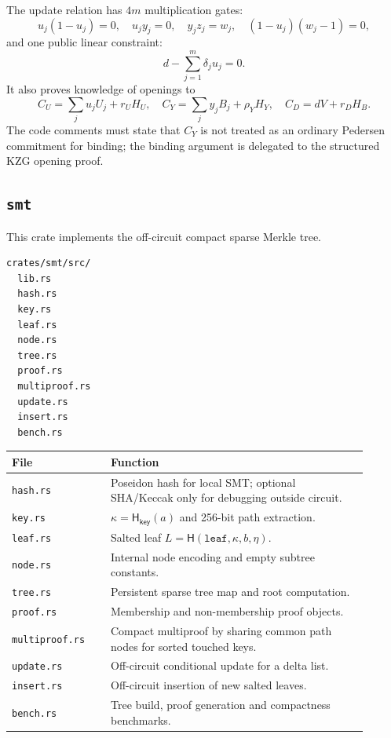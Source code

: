 \documentclass[UTF8,a4paper,11pt]{ctexart}
\newcommand{\Hash}{\mathsf H}
\begin{document}
The update relation has $4m$ multiplication gates:
\[
  u_j(1-u_j)=0,
  \quad u_jy_j=0,
  \quad y_jz_j=w_j,
  \quad (1-u_j)(w_j-1)=0,
\]
and one public linear constraint:
\[
  d-\sum_{j=1}^m\delta_j u_j=0.
\]
It also proves knowledge of openings to
\[
  C_U=\sum_j u_jU_j+r_UH_U,
  \quad C_Y=\sum_j y_jB_j+\rho_YH_Y,
  \quad C_D=dV+r_DH_B.
\]
The code comments must state that $C_Y$ is not treated as an ordinary Pedersen commitment for binding; the binding argument is delegated to the structured KZG opening proof.

\subsection{\texttt{smt}}

This crate implements the off-circuit compact sparse Merkle tree.

\begin{lstlisting}
crates/smt/src/
  lib.rs
  hash.rs
  key.rs
  leaf.rs
  node.rs
  tree.rs
  proof.rs
  multiproof.rs
  update.rs
  insert.rs
  bench.rs
\end{lstlisting}

\begin{longtable}{p{0.25\linewidth}p{0.65\linewidth}}
\toprule
File & Function \\
\midrule
\texttt{hash.rs} & Poseidon hash for local SMT; optional SHA/Keccak only for debugging outside circuit. \\
\texttt{key.rs} & $\kappa=\Hash_{\mathsf{key}}(a)$ and 256-bit path extraction. \\
\texttt{leaf.rs} & Salted leaf $L=\Hash(\mathtt{leaf},\kappa,b,\eta)$. \\
\texttt{node.rs} & Internal node encoding and empty subtree constants. \\
\texttt{tree.rs} & Persistent sparse tree map and root computation. \\
\texttt{proof.rs} & Membership and non-membership proof objects. \\
\texttt{multiproof.rs} & Compact multiproof by sharing common path nodes for sorted touched keys. \\
\texttt{update.rs} & Off-circuit conditional update for a delta list. \\
\texttt{insert.rs} & Off-circuit insertion of new salted leaves. \\
\texttt{bench.rs} & Tree build, proof generation and compactness benchmarks. \\
\bottomrule
\end{longtable}
\end{document}

